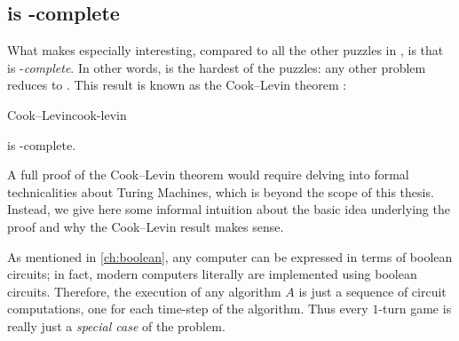 \subsection{ is \NP-complete}


What makes \CircSat{} especially interesting, compared to all the other puzzles
in \NP, is that \CircSat{} is \NP-\emph{complete}.  In other words, \CircSat{}
is the hardest of the \NP{} puzzles: any other \NP{} problem reduces to
\CircSat. This result is known as the Cook--Levin theorem \citep{cook.np,levin.np}:

\begin{theorem}{Cook--Levin}{cook-levin}

  \CircSat{} is \NP-complete.

\end{theorem}

A full proof of the Cook--Levin theorem would require delving into formal
technicalities about Turing Machines, which is beyond the scope of this thesis.
Instead, we give here some informal intuition about the basic idea underlying
the proof and why the Cook--Levin result makes sense.

As mentioned in \cref{ch:boolean}, any computer can be expressed in terms of
boolean circuits; in fact, modern computers literally are implemented using
boolean circuits. Therefore, the execution of any algorithm \(A\) is just a
sequence of circuit computations, one for each time-step of the algorithm. Thus
every \(1\)-turn game is really just a \emph{special case} of the
 problem.

